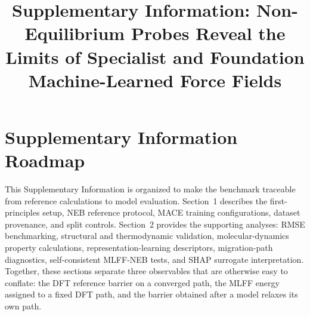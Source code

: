 \documentclass[pdflatex,sn-mathphys-num]{sn-jnl}%
\providecommand{\reviewermap}[3]{}
\theoremstyle{thmstyleone}%
\theoremstyle{thmstyletwo}%
\theoremstyle{thmstylethree}%
\begin{document}
\linenumbers

\title[Article Title]{Supplementary Information: Non-Equilibrium Probes Reveal the Limits of Specialist and Foundation Machine-Learned Force Fields}


\author[1]{ }

\author[1]{ }

\author*[1]{ }





\maketitle

\section*{Supplementary Information Roadmap}
\reviewermap{REV-A1/REV-A2/REV-A6/REV-C8/REV-C9/REV-C10/REV-C11/REV-C12/REV-C13}{done-local}{SI roadmap added to connect reference calculations, data provenance, task probes, and interpretability checks.}
This Supplementary Information is organized to make the benchmark traceable from reference calculations to model evaluation. Section~1 describes the first-principles setup, NEB reference protocol, MACE training configurations, dataset provenance, and split controls. Section~2 provides the supporting analyses: RMSE benchmarking, structural and thermodynamic validation, molecular-dynamics property calculations, representation-learning descriptors, migration-path diagnostics, self-consistent MLFF-NEB tests, and SHAP surrogate interpretation. Together, these sections separate three observables that are otherwise easy to conflate: the DFT reference barrier on a converged path, the MLFF energy assigned to a fixed DFT path, and the barrier obtained after a model relaxes its own path.
\end{document}
